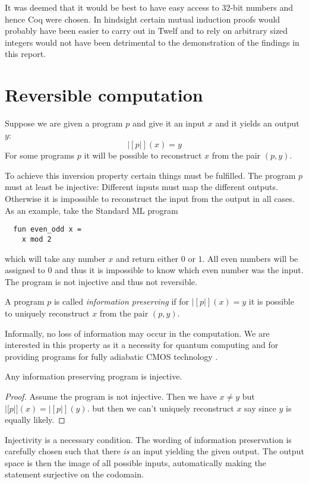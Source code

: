 It was deemed that it would be best to have easy access to 32-bit
numbers and hence Coq were chosen. In hindsight certain mutual
induction proofs would probably have been easier to carry out in Twelf
and to rely on arbitrary sized integers would not have been
detrimental to the demonstration of the findings in this report.

\section{Reversible computation}
\label{sec:revers-comp}

Suppose we are given a program $p$ and give it an input $x$ and it
yields an output $y$:
\begin{equation*}
  |[p|](x) = y
\end{equation*}
For some programs $p$ it will be possible to reconstruct $x$ from the
pair $(p, y)$.

To achieve this inversion property certain things must be
fulfilled. The program $p$ must at least be injective: Different
inputs must map the different outputs. Otherwise it is impossible to
reconstruct the input from the output in all cases. As an example,
take the Standard ML program
\begin{verbatim}
  fun even_odd x =
    x mod 2
\end{verbatim}
which will take any number $x$ and return either $0$ or $1$. All even
numbers will be assigned to $0$ and thus it is impossible to know
which even number was the input. The program is not injective and thus
not reversible.

\begin{defn}
  A program $p$ is called \emph{information preserving} if for
  $|[p|](x) = y$ it is possible to uniquely reconstruct $x$ from the
  pair $(p, y)$.
\end{defn}
Informally, no loss of information may occur in the computation. We
are interested in this property as it a necessity for quantum
computing  and for providing programs for fully
adiabatic CMOS technology .

\begin{thm}
  Any information preserving program is injective.
\end{thm}
\begin{proof}
  Assume the program is not injective. Then we have $x \neq y$ but
  $|[p|](x) = |[p|](y)$. but then we can't uniquely reconstruct $x$
  say since $y$ is equally likely.
\end{proof}
Injectivity is a necessary condition. The wording of information
preservation is carefully chosen such that there \emph{is} an input
yielding the given output. The output space is then the image of all
possible inputs, automatically making the statement surjective on the
codomain.

